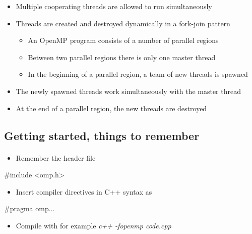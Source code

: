 \documentclass[%
twoside,                 %
final,                   %
10pt]{article}
\begin{document}
{\begin{itemize}
\item Multiple cooperating threads are allowed to run simultaneously

\item Threads are created and destroyed dynamically in a fork-join pattern
\begin{itemize}

   \item An OpenMP program consists of a number of parallel regions

   \item Between two parallel regions there is only one master thread

   \item In the beginning of a parallel region, a team of new threads is spawned

\end{itemize}

\noindent
  \item The newly spawned threads work simultaneously with the master thread

  \item At the end of a parallel region, the new threads are destroyed
\end{itemize}

\noindent



\subsection{Getting started, things to remember}

\paragraph{}
\begin{itemize}
 \item Remember the header file 
\end{itemize}

\noindent
\bcppcod
#include <omp.h>
\ecppcod
\begin{itemize}
 \item Insert compiler directives in C++ syntax as 
\end{itemize}

\noindent
\bcppcod
#pragma omp...
\ecppcod
\begin{itemize}
\item Compile with for example \emph{c++ -fopenmp code.cpp}


\end{itemize}}
\end{document}
